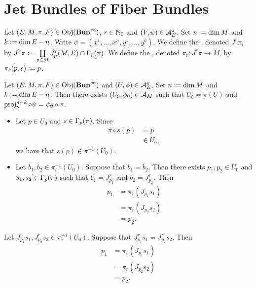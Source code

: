 \documentclass{book}
\begin{document}
\newpage
\section{Jet Bundles of Fiber Bundles}

\begin{defn}
	Let $(E, M, \pi, F) \in \operatorname{Obj}(\operatorname*{\text{\textbf{Bun}}^{\infty}})$, $r \in \mathbb{N}_0$ and $(V, \psi) \in \mathcal{A}_E^{\pi}$. Set $n \vcentcolon= \dim M$ and $k \vcentcolon= \dim E - n$. Write $\psi = (x^1, \ldots, x^n, y^1, \ldots, y^k)$. We define the , denoted $J^r \pi$, by $J^r \pi \vcentcolon= \coprod\limits_{p \in M} J^r_p(M, E) \cap \Gamma_p(\pi)$. We define the , denoted $\pi_r: J^r \pi \rightarrow M$, by $\pi_r(p, s) \vcentcolon= p$. 
\end{defn}

\begin{note}
	Let $(E, M, \pi, F) \in \operatorname{Obj}(\operatorname*{\text{\textbf{Bun}}^{\infty}})$ and $(U, \phi) \in \mathcal{A}_E^{\pi}$. Set $n \vcentcolon= \dim M$ and $k \vcentcolon= \dim E - n$. Then there exists $(U_0, \phi_0) \in \mathcal{A}_M$ such that $U_0 = \pi(U)$ and $\operatorname{\text{proj}}^{n+k}_{n} \circ \psi = \psi_0 \circ \pi$. 
	\begin{itemize}
		\item Let $p \in U_0$ and $s \in \Gamma_p(\pi)$. Since 
		\begin{align*}
			\pi \circ s(p)
			& = p \\
			& \in U_0,
		\end{align*}
		we have that $s(p) \in \pi^{-1}(U_0)$. 
		\item Let $b_1, b_2 \in \pi_r^{-1}(U_0)$. Suppose that $b_1 = b_2$. Then there exists $p_1, p_2 \in U_0$ and $s_1, s_2 \in \Gamma_p(\pi)$ such that $b_1 = J^r_{p_1}$ and $b_2 = J^r_{p_2}$. Then 
		\begin{align*}
			p_1
			& = \pi_r(J_{p_1} s_1) \\ 
			& = \pi_r(J_{p_2} s_2) \\
			& = p_2. 
		\end{align*}
	
	\end{itemize}
	Let $J^r_{p_1} s_1, J^r_{p_2} s_2 \in \pi_r^{-1}(U_0)$. Suppose that $J^r_{p_1} s_1 = J^r_{p_2} s_2$. Then 
	\begin{align*}
		p_1
		& = \pi_r(J_{p_1} s_1) \\ 
		& = \pi_r(J_{p_2} s_2) \\
		& = p_2. 
	\end{align*}
	
\end{note}
\end{document}
